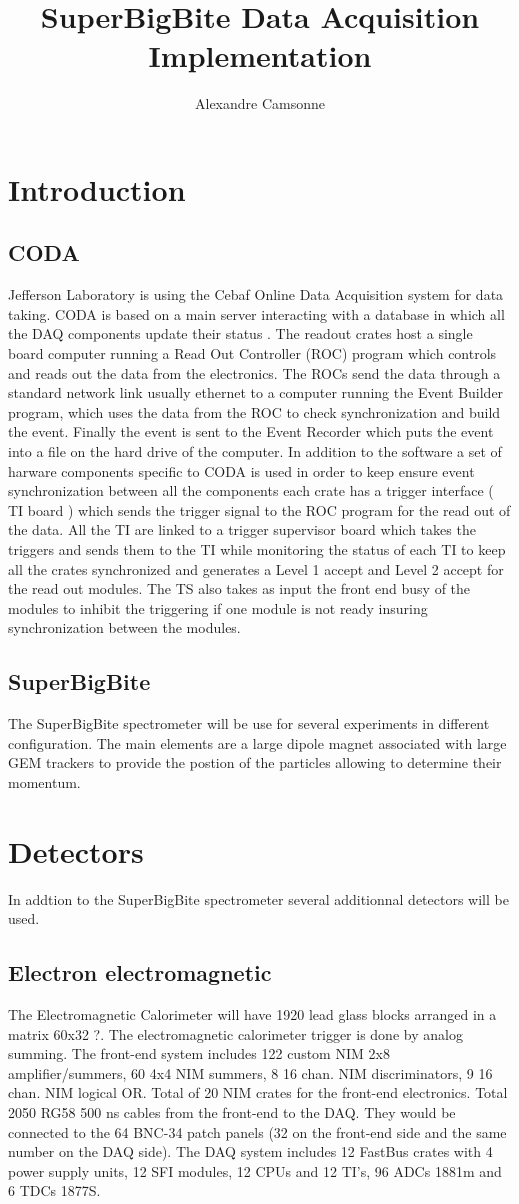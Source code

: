 \documentclass{article}
\title {SuperBigBite Data Acquisition Implementation}
\author{Alexandre Camsonne}
\begin{document}
\section{Introduction}
\subsection{CODA}
Jefferson Laboratory is using the Cebaf Online Data Acquisition system for data taking.
CODA is based on a main server interacting with a database in which all the DAQ components update their status . The readout crates host a single board computer running a Read Out Controller (ROC) program which controls and reads out the data from the electronics. The ROCs send the data through a standard network link usually ethernet to a computer running the Event Builder program, which uses the data from the ROC to check synchronization and build the event. Finally the event is sent to the Event Recorder which puts the event into a file on the hard drive of the computer.
In addition to the software a set of harware components specific to CODA is used in order to keep ensure event synchronization between all the components each crate has a trigger interface ( TI board ) which sends the trigger signal to the ROC program for the read out of the data. All the TI are linked to a trigger supervisor board which takes the triggers and sends them to the TI while monitoring the status of each TI to keep all the crates synchronized and generates a Level 1 accept and Level 2 accept for the read out modules. The TS also takes as input the front end busy of the modules to inhibit the triggering if one module is not ready insuring synchronization between the modules.


\subsection{SuperBigBite}
The SuperBigBite spectrometer will be use for several experiments in different configuration. The main elements are a large dipole magnet associated with large GEM trackers to provide the postion of the particles allowing to determine their momentum.
\section{Detectors}
In addtion to the SuperBigBite spectrometer several additionnal detectors will be used.
\subsection{Electron electromagnetic}
The Electromagnetic Calorimeter will have 1920 lead glass blocks arranged in a matrix 60x32 ?. The electromagnetic calorimeter trigger is done by analog summing. 
The front-end system includes 122 custom NIM 2x8 amplifier/summers, 60
4x4 NIM summers, 8 16 chan. NIM discriminators, 9 16 chan. NIM logical OR.
Total of 20 NIM crates for the front-end electronics. Total 2050 RG58 500 ns
cables from the front-end to the DAQ. They would be connected to the 64
BNC-34 patch panels (32 on the front-end side and the same number on the
DAQ side). 
The DAQ system includes 12 FastBus crates with 4 power supply units, 12 SFI
modules, 12 CPUs and 12 TI’s, 96 ADCs 1881m and 6 TDCs 1877S.
\end{document}

